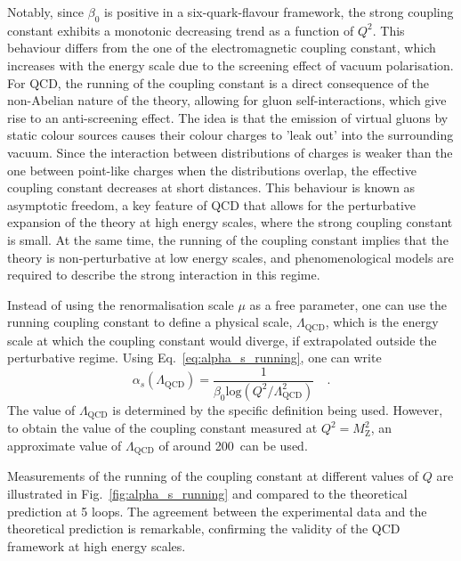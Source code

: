 Notably, since $\beta_0$ is positive in a six-quark-flavour framework, the strong coupling constant exhibits a monotonic decreasing trend as a function of $Q^2$. This behaviour differs from the one of the electromagnetic coupling constant, which increases with the energy scale due to the screening effect of vacuum polarisation. For QCD, the running of the coupling constant is a direct consequence of the non-Abelian nature of the theory, allowing for gluon self-interactions, which give rise to an anti-screening effect. The idea is that the emission of virtual gluons by static colour sources causes their colour charges to 'leak out' into the surrounding vacuum. Since the interaction between distributions of charges is weaker than the one between point-like charges when the distributions overlap, the effective coupling constant decreases at short distances. This behaviour is known as asymptotic freedom, a key feature of QCD that allows for the perturbative expansion of the theory at high energy scales, where the strong coupling constant is small. At the same time, the running of the coupling constant implies that the theory is non-perturbative at low energy scales, and phenomenological models are required to describe the strong interaction in this regime. 

Instead of using the renormalisation scale $\mu$ as a free parameter, one can use the running coupling constant to define a physical scale, $\Lambda_\mathrm{QCD}$, which is the energy scale at which the coupling constant would diverge, if extrapolated outside the perturbative regime. Using Eq.~\ref{eq:alpha_s_running}, one can write
\begin{equation*}
    \alpha_s(\Lambda_\mathrm{QCD}) = \frac{1}{\beta_0 \mathrm{log}(Q^2/\Lambda_\mathrm{QCD}^2)}\quad .
\end{equation*}
The value of $\Lambda_\mathrm{QCD}$ is determined by the specific definition being used. However, to obtain the value of the coupling constant measured at $Q^2 = M_\mathrm{Z}^2$, an approximate value of $\Lambda_\mathrm{QCD}$ of around 200~\mev can be used.

Measurements of the running of the coupling constant at different values of $Q$ are illustrated in Fig.~\ref{fig:alpha_s_running} and compared to the theoretical prediction at 5 loops. The agreement between the experimental data and the theoretical prediction is remarkable, confirming the validity of the QCD framework at high energy scales.


